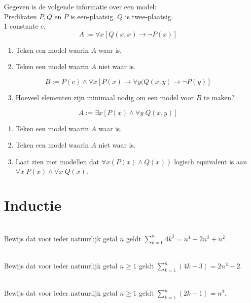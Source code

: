 \begin{exercise}
Gegeven is de volgende informatie over een model:\\
Predikaten $P,Q$ en $P$ is een-plaatsig, $Q$ is twee-plaatsig.\\
1 constante $c$.
$$A:=\forall x[Q(x,x)\rightarrow\neg P(x)]$$
\begin{enumerate}[label=\textit{\alph*.}]
\item Teken een model waarin $A$ waar is.
\item Teken een model waarin $A$ niet waar is.
\end{enumerate}
$$B:=P(c)\wedge\forall x[P(x)\rightarrow\forall y(Q(x,y)\rightarrow\neg P(y)]$$
\begin{enumerate}[label=\textit{\alph*.}]
\setcounter{enumi}{2}
\item Hoeveel elementen zijn minimaal nodig om een model voor $B$ te maken?
\end{enumerate}
\end{exercise}

\begin{exercise}
$$A:=\exists x[P(x)\wedge\forall y\;Q(x,y)]$$
\begin{enumerate}[label=\textit{\alph*.}]
\item Teken een model waarin $A$ waar is.
\item Teken een model waarin $A$ niet waar is.
\item Laat zien met modellen dat $\forall x(P(x)\wedge Q(x))$ logisch equivalent is aan $\forall x\; P(x)\wedge\forall x\;Q(x)$.
\end{enumerate}
\end{exercise}

\section{Inductie}
\setcounter{exerciseT}{0}
\begin{exercise}\mbox{}\\
Bewijs dat voor ieder natuurlijk getal $n$ geldt $\sum\limits^{n}_{k=0} 4k^3=n^4+2n^3+n^2$.
\end{exercise}

\begin{exercise}\mbox{}\\
Bewijs dat voor ieder natuurlijk getal $n\geq 1$ geldt $\sum\limits^{n}_{k=1}(4k-3)=2n^2-2$.
\end{exercise}

\begin{exercise}\mbox{}\\
Bewijs dat voor ieder natuurlijk getal $n\geq 1$ geldt $\sum\limits^n_{k=1}(2k-1)=n^2$.
\end{exercise}

